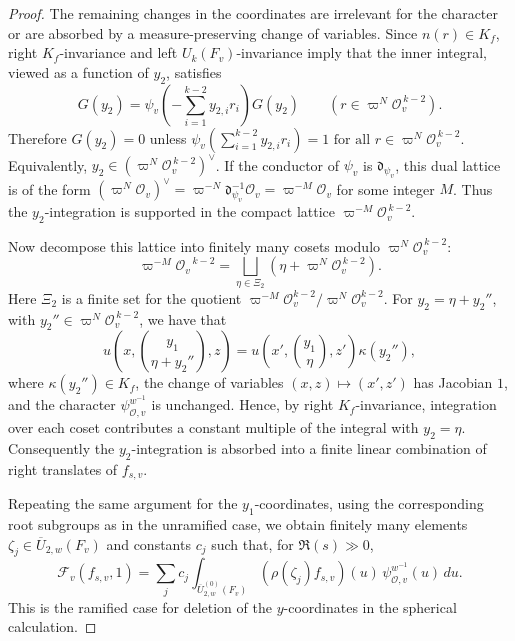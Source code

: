 \documentclass[11pt,notitlepage]{amsart}
\theoremstyle{definition}
\theoremstyle{remark}
\newcommand{\calF}{\mathcal{F}}
\newcommand{\calO}{\mathcal{O}}
\begin{document}
\begin{proof}
The remaining changes in the coordinates are irrelevant for the character or are
absorbed by a measure-preserving change of variables. Since \(n(r)\in K_f\), right
\(K_f\)-invariance and left \(U_k(F_v)\)-invariance imply that the inner integral,
viewed as a function of \(y_2\), satisfies
\[
  G(y_2)
  =
  \psi_v\!\left(-\sum_{i=1}^{k-2}y_{2,i}r_i\right)G(y_2)
  \qquad
  \left(r\in\varpi^N\calO_v^{\,k-2}\right).
\]
Therefore \(G(y_2)=0\) unless  $\psi_v\!\left(\sum_{i=1}^{k-2}y_{2,i}r_i\right)=1
  \text{ for all } r\in\varpi^N\calO_v^{\,k-2}$. Equivalently,
  $y_2\in \left(\varpi^N\calO_v^{\,k-2}\right)^\vee$.
If the conductor of \(\psi_v\) is \(\mathfrak d_{\psi_v}\), this dual lattice is of
the form
  $\left(\varpi^N\calO_v\right)^\vee
  =
  \varpi^{-N}\mathfrak d_{\psi_v}^{-1}\calO_v
  =
  \varpi^{-M}\calO_v$ for some integer \(M\). Thus the \(y_2\)-integration is supported in the compact lattice \(\varpi^{-M}\calO_v^{\,k-2}\).

Now decompose this lattice into finitely many cosets modulo
\(\varpi^N\calO_v^{\,k-2}\):
\[
  \varpi^{-M}{\calO_v}^{\,k-2}
  =
  \bigsqcup_{\eta\in \Xi_2}
  \left(\eta+\varpi^N\calO_v^{\,k-2}\right).
\]
Here \(\Xi_2\) is a finite set for the quotient $\varpi^{-M}\mathcal O_v^{k-2}/\varpi^N\mathcal O_v^{k-2}$. For \(y_2=\eta+y_2''\), with \(y_2''\in\varpi^N\calO_v^{\,k-2}\), we have that
\[
  u\!\left(x,\binom{y_1}{\eta+y_2''},z\right)
  =
  u\!\left(x',\binom{y_1}{\eta},z'\right)\kappa(y_2''),
\]
where \(\kappa(y_2'')\in K_f\), the change of variables \((x,z)\mapsto(x',z')\)
has Jacobian \(1\), and the character \(\psi^{w^{-1}}_{\calO,v}\) is unchanged.
Hence, by right \(K_f\)-invariance, integration over each coset contributes a
constant multiple of the integral with \(y_2=\eta\). Consequently the
\(y_2\)-integration is absorbed into a finite linear combination of right translates
of \(f_{s,v}\).

Repeating the same argument for the \(y_1\)-coordinates, using the corresponding
root subgroups as in the unramified case, we obtain finitely many elements
\(\zeta_j\in \overline U_{2,w}(F_v)\) and constants \(c_j\) such that, for
\(\Re(s)\gg0\),
\[
  \calF_v(f_{s,v},1)
  =
  \sum_j c_j
  \int_{\overline U^{(0)}_{2,w}(F_v)}
    (\rho(\zeta_j)f_{s,v})(u)\,
    \psi^{w^{-1}}_{\calO,v}(u)\,du .
\]
This is the ramified case for deletion of
the \(y\)-coordinates in the spherical calculation.


\end{proof}
\end{document}
